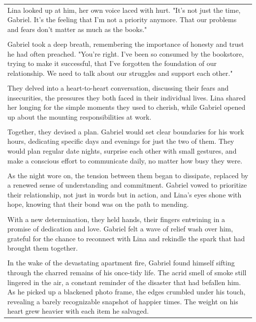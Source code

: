 \begin{small}
\begin{longtable}{p{}}
Lina looked up at him, her own voice laced with hurt. "It's not just the time, Gabriel. It's the feeling that I'm not a priority anymore. That our problems and fears don't matter as much as the books."
\\
\\
Gabriel took a deep breath, remembering the importance of honesty and trust he had often preached. "You're right. I've been so consumed by the bookstore, trying to make it successful, that I've forgotten the foundation of our relationship. We need to talk about our struggles and support each other."
\\
\\
They delved into a heart-to-heart conversation, discussing their fears and insecurities, the pressures they both faced in their individual lives. Lina shared her longing for the simple moments they used to cherish, while Gabriel opened up about the mounting responsibilities at work.
\\
\\
Together, they devised a plan. Gabriel would set clear boundaries for his work hours, dedicating specific days and evenings for just the two of them. They would plan regular date nights, surprise each other with small gestures, and make a conscious effort to communicate daily, no matter how busy they were.
\\
\\
As the night wore on, the tension between them began to dissipate, replaced by a renewed sense of understanding and commitment. Gabriel vowed to prioritize their relationship, not just in words but in action, and Lina's eyes shone with hope, knowing that their bond was on the path to mending.
\\
\\
With a new determination, they held hands, their fingers entwining in a promise of dedication and love. Gabriel felt a wave of relief wash over him, grateful for the chance to reconnect with Lina and rekindle the spark that had brought them together.
\\
\\
In the wake of the devastating apartment fire, Gabriel found himself sifting through the charred remains of his once-tidy life. The acrid smell of smoke still lingered in the air, a constant reminder of the disaster that had befallen him. As he picked up a blackened photo frame, the edges crumbled under his touch, revealing a barely recognizable snapshot of happier times. The weight on his heart grew heavier with each item he salvaged.
\\

\end{longtable}
\end{small}
